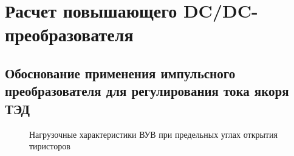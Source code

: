 \chapter{Расчет повышающего DC/DC-преобразователя}

\section{Обоснование применения импульсного преобразователя для регулирования тока якоря ТЭД}

\begin{figure}[H]
    \centering    
    
    \caption{Нагрузочные характеристики ВУВ при предельных углах открытия тиристоров}
    \label{fig:out_char_vuv}
\end{figure}
